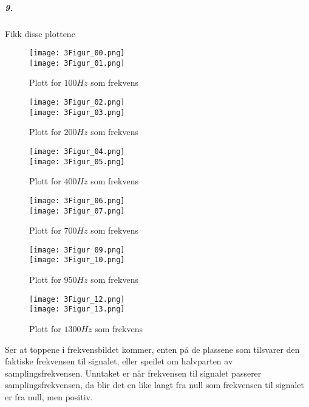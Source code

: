 \documentclass[11pt, A4paper,norsk]{article}
\begin{document}
			\subparagraph{9.}

				\begin{flushleft}
Fikk disse plottene
				\end{flushleft}
				\begin{figure}[H]
\caption{Plott for $100 Hz$ som frekvens}
\texttt{[image: 3Figur\_00.png]} \\
\texttt{[image: 3Figur\_01.png]} \\
				\end{figure}
				\begin{figure}[H]
\caption{Plott for $200 Hz$ som frekvens}
\texttt{[image: 3Figur\_02.png]} \\
\texttt{[image: 3Figur\_03.png]} \\
				\end{figure}
				\begin{figure}[H]
\caption{Plott for $400 Hz$ som frekvens}
\texttt{[image: 3Figur\_04.png]} \\
\texttt{[image: 3Figur\_05.png]} \\
				\end{figure}
				\begin{figure}[H]
\caption{Plott for $700 Hz$ som frekvens}
\texttt{[image: 3Figur\_06.png]} \\
\texttt{[image: 3Figur\_07.png]} \\
				\end{figure}
				\begin{figure}[H]
\caption{Plott for $950 Hz$ som frekvens}
\texttt{[image: 3Figur\_09.png]} \\
\texttt{[image: 3Figur\_10.png]} \\
				\end{figure}
				\begin{figure}[H]
\caption{Plott for $1300 Hz$ som frekvens}
\texttt{[image: 3Figur\_12.png]} \\
\texttt{[image: 3Figur\_13.png]}
				\end{figure}
				\begin{flushleft}
Ser at toppene i frekvensbildet kommer, enten på de plassene som tilsvarer den faktiske frekvensen til signalet, eller speilet om halvparten av samplingsfrekvensen. Unntaket er når frekvensen til signalet passerer samplingsfrekvensen, da blir det en like langt fra null som frekvensen til signalet er fra null, men positiv.
				\end{flushleft}
\end{document}
